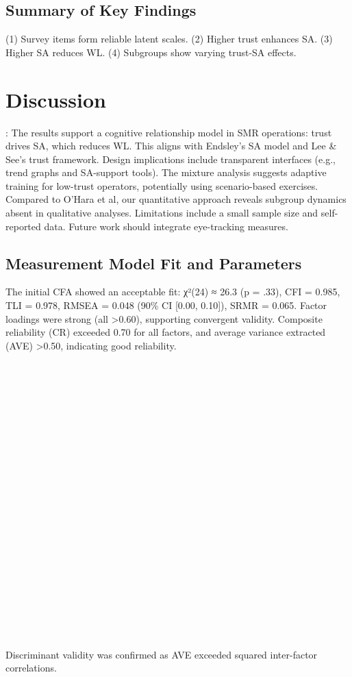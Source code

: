\documentclass[conference]{IEEEtran}
\begin{document}
\subsection{Summary of Key Findings}
(1) Survey items form reliable latent scales. (2) Higher trust enhances SA. (3) Higher SA reduces WL. (4) Subgroups show varying trust-SA effects.

\section{Discussion}:  
The results support a cognitive relationship model in SMR operations: trust drives SA, which reduces WL. This aligns with Endsley’s SA model and Lee & See’s trust framework. Design implications include transparent interfaces (e.g., trend graphs and SA-support tools). The mixture analysis suggests adaptive training for low-trust operators, potentially using scenario-based exercises. Compared to O’Hara et al, our quantitative approach reveals subgroup dynamics absent in qualitative analyses. Limitations include a small sample size and self-reported data. Future work should integrate eye-tracking measures.  

\subsection{Measurement Model Fit and Parameters}
The initial CFA showed an acceptable fit: χ²(24) ≈ 26.3 (p = .33), CFI = 0.985, TLI = 0.978, RMSEA = 0.048 (90\% CI [0.00, 0.10]), SRMR = 0.065. Factor loadings were strong (all >0.60), supporting convergent validity. Composite reliability (CR) exceeded 0.70 for all factors, and average variance extracted (AVE) >0.50, indicating good reliability. \\ \\ \\\\
\\
\\
\\
\\
\\
\\
\\
\\
\\
\\
\\
\\
\\
\\
\\
\\
\\
\\
\\
Discriminant validity was confirmed as AVE exceeded squared inter-factor correlations.
\end{document}

